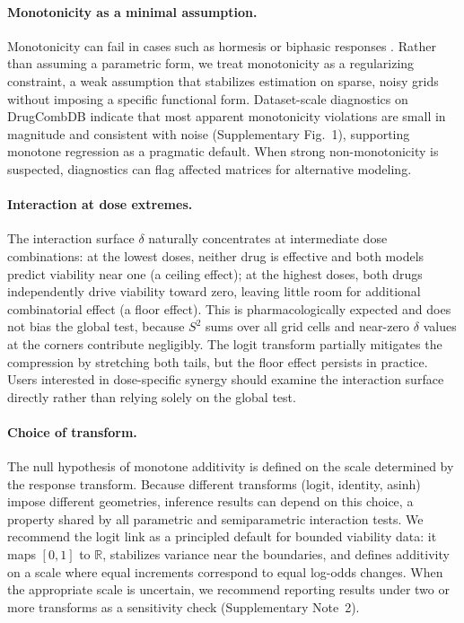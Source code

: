 \documentclass[unnumsec,webpdf,contemporary,large]{oup-authoring-template}
\begin{document}
\paragraph{Monotonicity as a minimal assumption.}
Monotonicity can fail in cases such as hormesis or biphasic responses \cite{Meyer2020}.
Rather than assuming a parametric form, we treat monotonicity as a regularizing constraint, a weak assumption that stabilizes estimation on sparse, noisy grids without imposing a specific functional form.
Dataset-scale diagnostics on DrugCombDB indicate that most apparent monotonicity violations are small in magnitude and consistent with noise (Supplementary Fig.~1), supporting monotone regression as a pragmatic default.
When strong non-monotonicity is suspected, diagnostics can flag affected matrices for alternative modeling.

\paragraph{Interaction at dose extremes.}
The interaction surface $\delta$ naturally concentrates at intermediate dose combinations: at the lowest doses, neither drug is effective and both models predict viability near one (a ceiling effect); at the highest doses, both drugs independently drive viability toward zero, leaving little room for additional combinatorial effect (a floor effect).
This is pharmacologically expected and does not bias the global test, because $S^2$ sums over all grid cells and near-zero $\delta$ values at the corners contribute negligibly.
The logit transform partially mitigates the compression by stretching both tails, but the floor effect persists in practice.
Users interested in dose-specific synergy should examine the interaction surface directly rather than relying solely on the global test.

\paragraph{Choice of transform.}
The null hypothesis of monotone additivity is defined on the scale determined by the response transform.
Because different transforms (logit, identity, asinh) impose different geometries, inference results can depend on this choice, a property shared by all parametric and semiparametric interaction tests.
We recommend the logit link as a principled default for bounded viability data: it maps $[0,1]$ to $\mathbb{R}$, stabilizes variance near the boundaries, and defines additivity on a scale where equal increments correspond to equal log-odds changes.
When the appropriate scale is uncertain, we recommend reporting results under two or more transforms as a sensitivity check (Supplementary Note~2).
\end{document}
